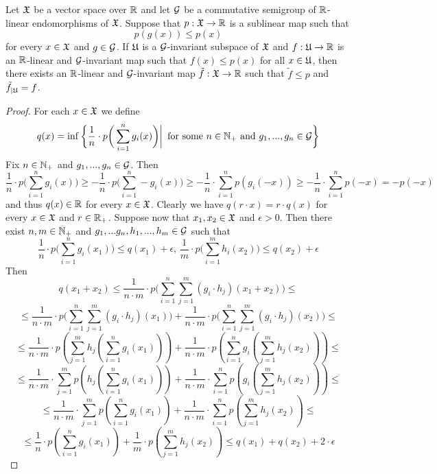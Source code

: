 \begin{theorem}\label{theorem:invariant_Hahn_Banach}
Let ${\mathfrak X}$ be a vector space over ${\mathbb R}$ and let ${\mathcal G}$ be a commutative semigroup of ${\mathbb R}$-linear endomorphisms of ${\mathfrak X}$. Suppose that $p:{\mathfrak X}\rightarrow {\mathbb R}$ is a sublinear map such that
$$p\left(g(x)\right) \leq p(x)$$
for every $x \in {\mathfrak X}$ and $g \in {\mathcal G}$. If ${\mathfrak U}$ is a ${\mathcal G}$-invariant subspace of ${\mathfrak X}$ and $f:{\mathfrak U}\rightarrow {\mathbb R}$ is an ${\mathbb R}$-linear and ${\mathcal G}$-invariant map such that $f(x)\leq p(x)$ for all $x\in {\mathfrak U}$, then there exists an ${\mathbb R}$-linear and ${\mathcal G}$-invariant map $\tilde{f}:{\mathfrak X} \rightarrow {\mathbb R}$ such that $\tilde{f} \leq p$ and $\tilde{f}_{\mid {\mathfrak U}} = f$.
\end{theorem}
\begin{proof}
For each $x \in {\mathfrak X}$ we define
$$q(x) = \inf \bigg\{\frac{1}{n}\cdot p\bigg(\sum_{i=1}^ng_i(x)\bigg)\bigg|\,\mbox{ for some }n\in {\mathbb N}_+\mbox{ and }g_1,...,g_n\in {\mathcal G}\bigg\}$$
Fix $n\in {\mathbb N}_+$ and $g_1,...,g_n\in {\mathcal G}$. Then
$$\frac{1}{n}\cdot p\bigg(\sum_{i=1}^ng_i(x)\bigg)\geq -\frac{1}{n}\cdot p\bigg(\sum_{i=1}^n-g_i(x)\bigg) \geq -\frac{1}{n}\cdot \sum_{i=1}^np\left(g_i(-x)\right) \geq -\frac{1}{n}\cdot \sum_{i=1}^np\left(-x\right) = -p(-x)$$
and thus $q(x) \in {\mathbb R}$ for every $x\in {\mathfrak X}$. Clearly we have $q(r\cdot x) = r\cdot q(x)$ for every $x\in {\mathfrak X}$ and $r\in {\mathbb R}_+$. Suppose now that $x_1,x_2\in {\mathfrak X}$ and $\epsilon > 0$. Then there exist $n,m \in {\mathbb N}_+$ and $g_1,...g_n,h_1,...,h_m \in {\mathcal G}$ such that 
$$\frac{1}{n}\cdot p\bigg(\sum_{i=1}^ng_i(x_1)\bigg) \leq q(x_1) + \epsilon,\,\frac{1}{m}\cdot p\bigg(\sum_{i=1}^m h_i(x_2)\bigg) \leq q(x_2) + \epsilon$$
Then
$$q(x_1 + x_2) \leq \frac{1}{n\cdot m}\cdot p\bigg(\sum_{i=1}^n\sum_{j=1}^m\left(g_i\cdot h_j\right)(x_1 + x_2)\bigg) \leq$$
$$\leq \frac{1}{n\cdot m}\cdot p\bigg(\sum_{i=1}^n\sum_{j=1}^m \left(g_i\cdot h_j\right)(x_1)\bigg) + \frac{1}{n\cdot m}\cdot p\bigg(\sum_{i=1}^n\sum_{j=1}^m\left(g_i\cdot h_j\right)(x_2)\bigg) \leq$$
$$\leq \frac{1}{n\cdot m}\cdot p\left(\sum_{j=1}^m h_j\left(\sum_{i=1}^n g_i\left(x_1\right)\right)\right) + \frac{1}{n\cdot m}\cdot p\left(\sum_{i=1}^n g_i\left(\sum_{j=1}^m h_j\left(x_2\right)\right)\right) \leq $$
$$\leq \frac{1}{n\cdot m}\cdot \sum_{j=1}^m p\left(h_j\left(\sum_{i=1}^n g_i\left(x_1\right)\right)\right) + \frac{1}{n\cdot m}\cdot \sum_{i=1}^n p\left(g_i\left(\sum_{j=1}^m h_j\left(x_2\right)\right)\right) \leq $$
$$\leq \frac{1}{n\cdot m}\cdot \sum_{j=1}^m p\left(\sum_{i=1}^n g_i\left(x_1\right)\right) + \frac{1}{n\cdot m}\cdot \sum_{i=1}^n p\left(\sum_{j=1}^m h_j\left(x_2\right)\right) \leq $$
$$\leq  \frac{1}{n}\cdot p\left(\sum_{i=1}^n g_i\left(x_1\right)\right) + \frac{1}{m}\cdot p\left(\sum_{j=1}^m h_j\left(x_2\right)\right) \leq q(x_1) + q(x_2) + 2\cdot \epsilon$$

\end{proof}
